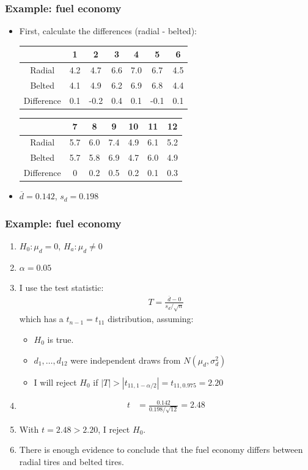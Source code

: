 \documentclass[handout]{beamer}\usepackage[]{graphicx}\usepackage[]{color}
\providecommand{\ov}[1]{\overline{#1}}
\numberwithin{equation}{section}
\begin{document}
\begin{frame}
\frametitle{Example: fuel economy}
\begin{itemize}
\item First, calculate the differences (radial - belted):
\begin{center}
\begin{tabular}{ccccccc}
 & 1 & 2 & 3 & 4 & 5& 6 \\ \hline
Radial        & 4.2 &4.7 &   6.6 &7.0 &6.7& 4.5  \\ 
Belted        & 4.1 &4.9 &   6.2 &6.9 &6.8 &4.4  \\ 
Difference & 0.1 & -0.2 & 0.4 &0.1 &-0.1&0.1
\end{tabular} 
\begin{tabular}{ccccccc}
 & 7 & 8 & 9 & 10 & 11 & 12 \\ \hline
Radial & 5.7 &6.0& 7.4 &4.9 &6.1 & 5.2  \\ 
Belted &5.7 &5.8 &6.9& 4.7 &6.0 &4.9 \\ 
Difference &0 & 0.2 & 0.5 & 0.2 & 0.1 & 0.3
\end{tabular}
\end{center}
\pause \item $\ov{d} = 0.142$, $s_d = 0.198$
\end{itemize}
\end{frame}



\begin{frame}
\frametitle{Example: fuel economy} \scriptsize
\begin{enumerate}[1. ]
\item $H_0: \mu_d = 0$, $H_a: \mu_d \ne 0$
\pause \item $\alpha = 0.05$
\pause \item I use the test statistic:
\pause \begin{align*}
T = \frac{\ov{d} - 0}{s_d/\sqrt{n}}
\end{align*}
which has a $t_{n - 1}  = t_{11}$ distribution, assuming:
\begin{itemize}
\pause \item $H_0$ is true.
\pause \item $d_1, \ldots, d_{12}$ were independent draws from $N(\mu_d, \sigma^2_d)$ 
\end{itemize}
\begin{itemize}
\pause \item I will reject $H_0$ if $|T| > |t_{11, 1 - \alpha/2}| = t_{11, 0.975} = 2.20$
\end{itemize}
\pause \item 
\pause \begin{align*}
t &= \frac{0.142}{0.198/\sqrt{12}} =  2.48 
\end{align*}
\pause \item With $t = 2.48 > 2.20$, I reject $H_0$.
\pause \item There is enough evidence to conclude that the fuel economy differs between radial tires and belted tires.
\end{enumerate}
\end{frame}
\end{document}
